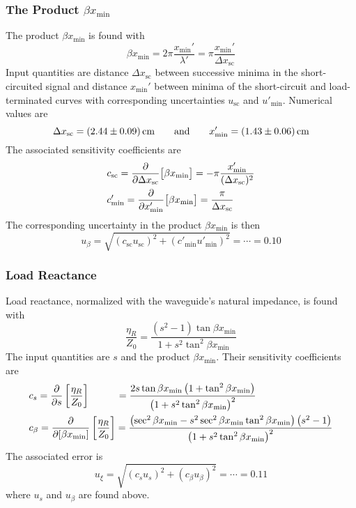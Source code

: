 \documentclass[11pt, a4paper]{article}
\newcommand{\eqtext}[1]{\qquad \text{#1} \qquad}
\begin{document}
\subsubsection{The Product $ \beta x_{\text{min}} $}
The product $ \beta x_{\text{min}}  $ is found with
\begin{equation*}
	\beta x_{\text{min}} = 2\pi \frac{x_{\text{min}}'}{\lambda'} = \pi \frac{x_{\text{min}}'}{\Delta x_{\text{sc}}}
\end{equation*}
Input quantities are distance $ \Delta x_{\text{sc}} $ between successive minima in the short-circuited signal and distance $ x_{\text{min}}' $ between minima of the short-circuit and load-terminated curves with corresponding uncertainties $ u_{\text{sc}} $ and $ u'_{\text{min}} $. Numerical values are
\begin{equation*}
	\Delta x_{\text{sc}} = \SI{2.44 \pm 0.09}{\centi \meter} \eqtext{and} x'_{\text{min}} = \SI{1.43 \pm 0.06}{\centi \meter}
\end{equation*}
The associated sensitivity coefficients are
\begin{align*}
	&c_{\text{sc}} = \pdv{}{\Delta x_{\text{sc}}}\big[\beta x_{\text{min}} \big] = - \pi \frac{x_{\text{min}}'}{(\Delta x_{\text{sc}})^{2}}\\
	&c'_{\text{min}} = \pdv{}{x'_{\text{min}}}\big[\beta x_{\text{min}} \big] = \frac{\pi}{\Delta x_{\text{sc}}}
\end{align*}
The corresponding uncertainty in the product $ \beta x_{\text{min}} $ is then
\begin{equation*}
	u_{\beta} = \sqrt{(c_{\text{sc}}u_{\text{sc}})^2 + (c'_{\text{min}}u'_{\text{min}})^2} = \cdots = 0.10
\end{equation*}

\subsubsection{Load Reactance}
Load reactance, normalized with the waveguide's natural impedance, is found with
\begin{equation*}
	\frac{\eta_{R}}{Z_{0}} = \frac{(s^{2} - 1) \tan \beta x_{\text{min}}}{1 + s^{2}\tan^{2}\beta x_{\text{min}}}
\end{equation*}
The input quantities are $ s $ and the product $ \beta x_{\text{min}} $. Their sensitivity coefficients are
\begin{align*}
	&c_{s} = \pdv{s}\left[\frac{\eta_{R}}{Z_{0}}\right] \hspace{10mm} = \frac{2s\tan \beta x_{\text{min}}\left(1 + \tan^{2} \beta x_{\text{min}}\right)}{\left(1+s^{2}\tan^{2} \beta x_{\text{min}}\right)^2}\\
	&c_{\beta} = \pdv{[\beta x_{\text{min}}]}\left[\frac{\eta_{R}}{Z_{0}}\right] = \frac{\left(\sec ^2\beta x_{\text{min}}-s^2\sec ^2\beta x_{\text{min}}\tan ^2\beta x_{\text{min}}\right)\left(s^2-1\right)}{\left(1+s^2\tan ^2\beta x_{\text{min}}\right)^2}
\end{align*}
The associated error is
\begin{equation*}
	u_{\xi} = \sqrt{(c_{s}u_{s})^{2} + (c_{\beta}u_{\beta})^{2}} = \cdots = 0.11
\end{equation*}
where $ u_{s} $ and $ u_{\beta} $ are found above.
\end{document}

